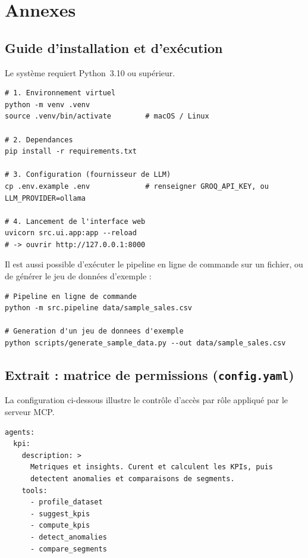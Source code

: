 \chapter{Annexes}

\section{Guide d'installation et d'exécution}
Le système requiert Python~3.10 ou supérieur.

\begin{lstlisting}[caption={Installation et lancement.}]
# 1. Environnement virtuel
python -m venv .venv
source .venv/bin/activate        # macOS / Linux

# 2. Dependances
pip install -r requirements.txt

# 3. Configuration (fournisseur de LLM)
cp .env.example .env             # renseigner GROQ_API_KEY, ou LLM_PROVIDER=ollama

# 4. Lancement de l'interface web
uvicorn src.ui.app:app --reload
# -> ouvrir http://127.0.0.1:8000
\end{lstlisting}

Il est aussi possible d'exécuter le pipeline en ligne de commande sur un
fichier, ou de générer le jeu de données d'exemple :

\begin{lstlisting}[caption={Exécutions alternatives.}]
# Pipeline en ligne de commande
python -m src.pipeline data/sample_sales.csv

# Generation d'un jeu de donnees d'exemple
python scripts/generate_sample_data.py --out data/sample_sales.csv
\end{lstlisting}

\section{Extrait : matrice de permissions (\texttt{config.yaml})}
La configuration ci-dessous illustre le contrôle d'accès par rôle appliqué
par le serveur MCP.

\begin{lstlisting}[caption={Définition d'un agent et de ses outils autorisés.}]
agents:
  kpi:
    description: >
      Metriques et insights. Curent et calculent les KPIs, puis
      detectent anomalies et comparaisons de segments.
    tools:
      - profile_dataset
      - suggest_kpis
      - compute_kpis
      - detect_anomalies
      - compare_segments
\end{lstlisting}

